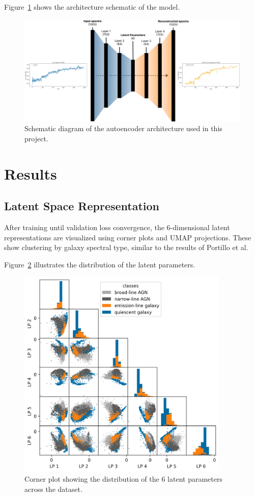 \documentclass[11pt]{article}
\begin{document}
Figure~\ref{fig:architecture} shows the architecture schematic of the model.

\begin{figure}[h!]
    \centering
    \includegraphics[width=\textwidth]{autoencoder_schematic.pdf}
    \caption{Schematic diagram of the autoencoder architecture used in this project.}
    \label{fig:architecture}
\end{figure}

\section{Results}
\subsection{Latent Space Representation}
After training until validation loss convergence, the 6-dimensional latent representations are visualized using corner plots and UMAP projections. These show clustering by galaxy spectral type, similar to the results of Portillo et al.

Figure~\ref{fig:cornerplot} illustrates the distribution of the latent parameters.

\begin{figure}[h!]
    \centering
    \includegraphics[width=0.9\textwidth]{corner.pdf}
    \caption{Corner plot showing the distribution of the 6 latent parameters across the dataset.}
    \label{fig:cornerplot}
\end{figure}
\end{document}

